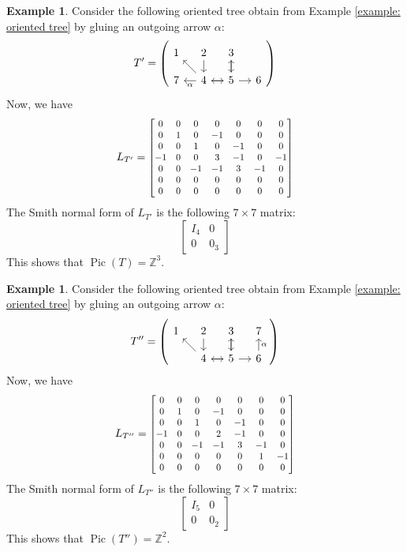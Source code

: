 \documentclass[11pt,reqno]{amsart}
\DeclareMathOperator{\Pic}{Pic}
\newcommand\scalemath[2]{\scalebox{#1}{\mbox{\ensuremath{\displaystyle #2}}}}
\theoremstyle{definition}
\newtheorem{myeg}[mydef]{Example}
\theoremstyle{plain}
\begin{document}
\begin{myeg}
Consider the following oriented tree obtain from Example \ref{example: oriented tree} by gluing an outgoing arrow $\alpha$:
\[
T'=\left(\begin{tikzcd}[row sep=0.4cm, column sep=0.4cm]
1 	& 2 \arrow[d,swap] &  3 \arrow[d] & \\
7& 4\arrow[r,swap] \arrow[ul] \arrow[l,"\alpha"] & 5 \arrow[l] \arrow[u]\arrow[r,swap] & 6
\end{tikzcd}\right)
\]
Now, we have
\[
L_{T'} =\scalemath{0.85}{\begin{bmatrix}
0&0 &0 &0 &0 &0 &0 \\
0&1 &0 &-1 &0 &0 &0\\
0& 0& 1&0 &-1 &0 &0\\
-1& 0& 0& 3&-1 &0 &-1\\
0&0 &-1 &-1 &3 &-1 &0\\
0& 0&0 &0 &0 &0 & 0 \\
0& 0&0 &0 &0 &0 & 0
\end{bmatrix} }
\]
The Smith normal form of $L_{T'}$ is the following $7 \times 7$ matrix:
\[
\left[\begin{array}{c|c}
I_4 & 0 \\ \hline
0 & 0_3
\end{array}\right]
\]
This shows that $\Pic(T)=\mathbb{Z}^3$.
\end{myeg}

\begin{myeg}
Consider the following oriented tree obtain from Example \ref{example: oriented tree} by gluing an outgoing arrow $\alpha$:
\[
T''=\left(\begin{tikzcd}[row sep=0.4cm, column sep=0.4cm]
1
& 2 \arrow[d,swap] &  3 \arrow[d] & 7\\
& 4\arrow[r,swap] \arrow[ul] & 5 \arrow[l] \arrow[u]\arrow[r,swap] & 6 \arrow[u,swap,"\alpha"]
\end{tikzcd}\right)
\]
Now, we have
\[
L_{T''}=\scalemath{0.85}{\begin{bmatrix}
0&0 &0 &0 &0 &0 &0 \\
0&1 &0 &-1 &0 &0 &0\\
0& 0& 1&0 &-1 &0 &0\\
-1& 0& 0& 2&-1 &0 &0\\
0&0 &-1 &-1 &3 &-1 &0\\
0& 0&0 &0 &0 &1 & -1 \\
0& 0&0 &0 &0 &0 & 0
\end{bmatrix}}
\]
The Smith normal form of $L_{T''}$ is the following $7 \times 7$ matrix:
\[
\left[\begin{array}{c|c}
I_5 & 0  \\ \hline
0 & 0_2
\end{array}\right]
\]
This shows that $\Pic(T'')=\mathbb{Z}^2$.
\end{myeg}
\end{document}
